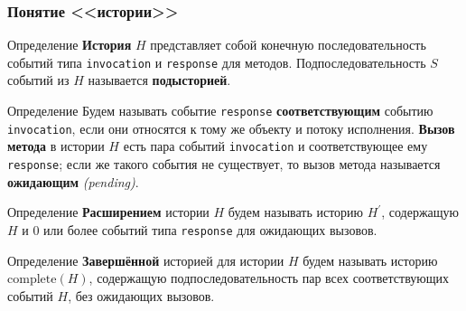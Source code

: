\documentclass[aspectratio=169, pdf, 8pt, unicode]{beamer}
\newcounter{defCnt}
\begin{document}
\begin{frame}
\frametitle{Понятие <<истории>>}

\begin{block}{Определение }
    \textbf{История} $H$ представляет собой конечную последовательность событий типа \texttt{invocation} и \texttt{response} для методов.
    Подпоследовательность $S$ событий из $H$ называется \textbf{подысторией}.
\end{block}

\begin{block}{Определение }
    Будем называть событие \texttt{response} \textbf{соответствующим} событию \texttt{invocation}, если они относятся к тому же объекту и
    потоку исполнения. \textbf{Вызов метода} в истории $H$ есть пара событий \texttt{invocation} и соответствующее ему \texttt{response};
    если же такого события не существует, то вызов метода называется \textbf{ожидающим} \textit{(pending)}.
\end{block}

\begin{block}{Определение }
    \textbf{Расширением} истории $H$ будем называть историю $H^{\prime}$, содержащую $H$ и 0 или более событий типа \texttt{response}
    для ожидающих вызовов.
\end{block}

\begin{block}{Определение }
    \textbf{Завершённой} историей для истории $H$ будем называть историю $\mathrm{complete}(H)$, содержащую подпоследовательность пар всех
    соответствующих событий $H$, без ожидающих вызовов.
\end{block}

\end{frame}
\end{document}
